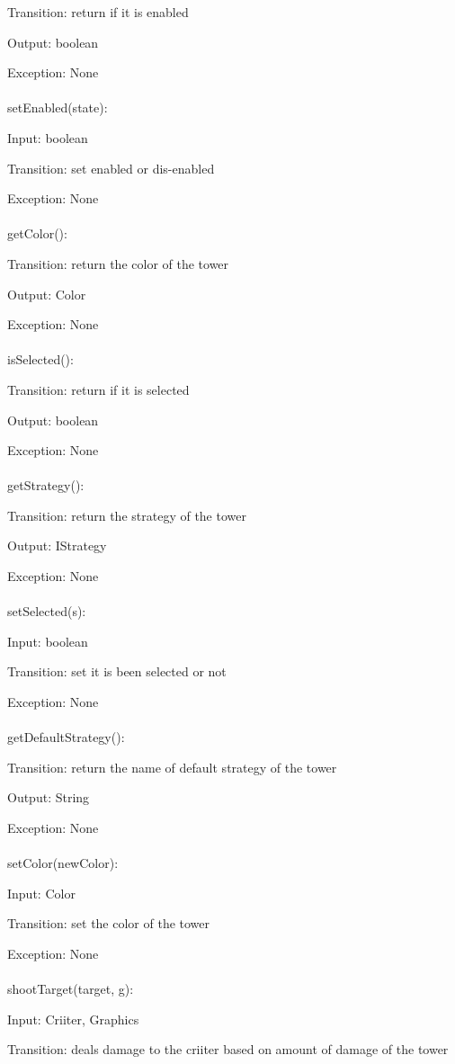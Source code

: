 \documentclass[12,english]{article}
\begin{document}
		Transition: return if it is enabled
		
		Output: boolean
		
		Exception: None\\
		\\
		setEnabled(state):
		
		Input: boolean
		
		Transition: set enabled or dis-enabled
		
		Exception: None\\
		\\
		getColor():
		
		Transition: return the color of the tower
		
		Output: Color
		
		Exception: None\\
		\\
		isSelected():
		
		Transition: return if it is selected
		
		Output: boolean
		
		Exception: None\\
		\\
		getStrategy():
		
		Transition: return the strategy of the tower
		
		Output: IStrategy
		
		Exception: None\\
		\\
		setSelected(s):
		
		Input: boolean
		
		Transition: set it is been selected or not 
		
		Exception: None\\
		\\
		getDefaultStrategy():
		
		Transition: return the name of default strategy of the tower
		
		Output: String
		
		Exception: None\\
		\\
		setColor(newColor):
		
		Input: Color
		
		Transition: set the color of the tower
		
		Exception: None\\
		\\
		shootTarget(target, g):
		
		Input: Criiter, Graphics
		
		Transition: deals damage to the criiter based on amount of damage of the tower
		
\end{document}
